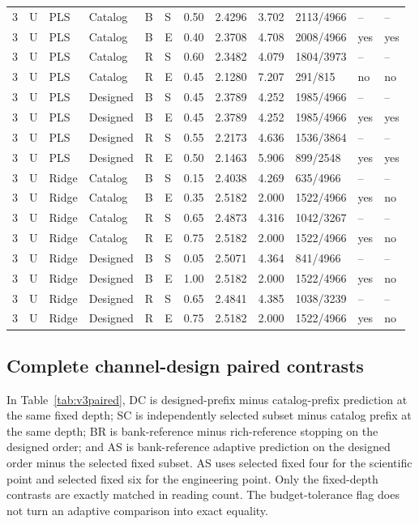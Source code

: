 \documentclass[10pt,a4paper]{article}
\begin{document}
\begin{longtable}{rlllllrrrlll}
3 & U & PLS & Catalog & B & S & 0.50 & 2.4296 & 3.702 & 2113/4966 & -- & -- \\
3 & U & PLS & Catalog & B & E & 0.40 & 2.3708 & 4.708 & 2008/4966 & yes & yes \\
3 & U & PLS & Catalog & R & S & 0.60 & 2.3482 & 4.079 & 1804/3973 & -- & -- \\
3 & U & PLS & Catalog & R & E & 0.45 & 2.1280 & 7.207 & 291/815 & no & no \\
3 & U & PLS & Designed & B & S & 0.45 & 2.3789 & 4.252 & 1985/4966 & -- & -- \\
3 & U & PLS & Designed & B & E & 0.45 & 2.3789 & 4.252 & 1985/4966 & yes & yes \\
3 & U & PLS & Designed & R & S & 0.55 & 2.2173 & 4.636 & 1536/3864 & -- & -- \\
3 & U & PLS & Designed & R & E & 0.50 & 2.1463 & 5.906 & 899/2548 & yes & yes \\
3 & U & Ridge & Catalog & B & S & 0.15 & 2.4038 & 4.269 & 635/4966 & -- & -- \\
3 & U & Ridge & Catalog & B & E & 0.35 & 2.5182 & 2.000 & 1522/4966 & yes & no \\
3 & U & Ridge & Catalog & R & S & 0.65 & 2.4873 & 4.316 & 1042/3267 & -- & -- \\
3 & U & Ridge & Catalog & R & E & 0.75 & 2.5182 & 2.000 & 1522/4966 & yes & no \\
3 & U & Ridge & Designed & B & S & 0.05 & 2.5071 & 4.364 & 841/4966 & -- & -- \\
3 & U & Ridge & Designed & B & E & 1.00 & 2.5182 & 2.000 & 1522/4966 & yes & no \\
3 & U & Ridge & Designed & R & S & 0.65 & 2.4841 & 4.385 & 1038/3239 & -- & -- \\
3 & U & Ridge & Designed & R & E & 0.75 & 2.5182 & 2.000 & 1522/4966 & yes & no \\
\end{longtable}
\endgroup

\subsection{Complete channel-design paired contrasts}
In Table~\ref{tab:v3paired}, DC is designed-prefix minus catalog-prefix prediction at the same fixed depth; SC is independently selected subset minus catalog prefix at the same depth; BR is bank-reference minus rich-reference stopping on the designed order; and AS is bank-reference adaptive prediction on the designed order minus the selected fixed subset. AS uses selected fixed four for the scientific point and selected fixed six for the engineering point. Only the fixed-depth contrasts are exactly matched in reading count. The budget-tolerance flag does not turn an adaptive comparison into exact equality.
\end{document}
